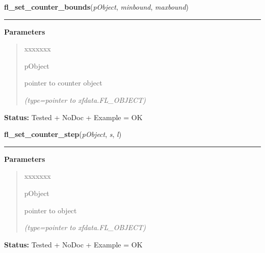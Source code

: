 \hspace{.8\funcindent}\begin{boxedminipage}{\funcwidth}

    \raggedright \textbf{fl\_set\_counter\_bounds}(\textit{pObject}, \textit{minbound}, \textit{maxbound})

    \vspace{-1.5ex}

    \rule{\textwidth}{0.5\fboxrule}
\setlength{\parskip}{2ex}
\setlength{\parskip}{1ex}
      \textbf{Parameters}
      \vspace{-1ex}

      \begin{quote}
        \begin{Ventry}{xxxxxxx}

          \item[pObject]

          pointer to counter object

            {\it (type=pointer to xfdata.FL\_OBJECT)}

        \end{Ventry}

      \end{quote}

\textbf{Status:} Tested + NoDoc + Example = OK



    \end{boxedminipage}

    \label{xformslib:library:fl_set_counter_step}

    \vspace{0.5ex}

\hspace{.8\funcindent}\begin{boxedminipage}{\funcwidth}

    \raggedright \textbf{fl\_set\_counter\_step}(\textit{pObject}, \textit{s}, \textit{l})

    \vspace{-1.5ex}

    \rule{\textwidth}{0.5\fboxrule}
\setlength{\parskip}{2ex}
\setlength{\parskip}{1ex}
      \textbf{Parameters}
      \vspace{-1ex}

      \begin{quote}
        \begin{Ventry}{xxxxxxx}

          \item[pObject]

          pointer to object

            {\it (type=pointer to xfdata.FL\_OBJECT)}

        \end{Ventry}

      \end{quote}

\textbf{Status:} Tested + NoDoc + Example = OK



    \end{boxedminipage}

